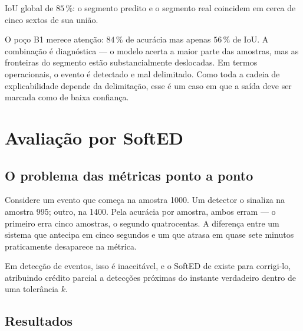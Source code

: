 \begin{resultadochave}
IoU global de $85\,\%$: o segmento predito e o segmento real coincidem em cerca de cinco
sextos de sua união.
\end{resultadochave}

O poço B1 merece atenção: $84\,\%$ de acurácia mas apenas $56\,\%$ de IoU. A combinação é
diagnóstica --- o modelo acerta a maior parte das amostras, mas as fronteiras do
segmento estão substancialmente deslocadas. Em termos operacionais, o evento é detectado
e mal delimitado. Como toda a cadeia de explicabilidade depende da delimitação, esse é
um caso em que a saída deve ser marcada como de baixa confiança.

\section{Avaliação por SoftED}

\subsection{O problema das métricas ponto a ponto}

Considere um evento que começa na amostra 1000. Um detector o sinaliza na amostra 995;
outro, na 1400. Pela acurácia por amostra, ambos erram --- o primeiro erra cinco
amostras, o segundo quatrocentas. A diferença entre um sistema que antecipa em cinco
segundos e um que atrasa em quase sete minutos praticamente desaparece na métrica.

Em detecção de eventos, isso é inaceitável, e o SoftED de \citet{Salles2024softed}
existe para corrigi-lo, atribuindo crédito parcial a detecções próximas do instante
verdadeiro dentro de uma tolerância $k$.

\subsection{Resultados}

